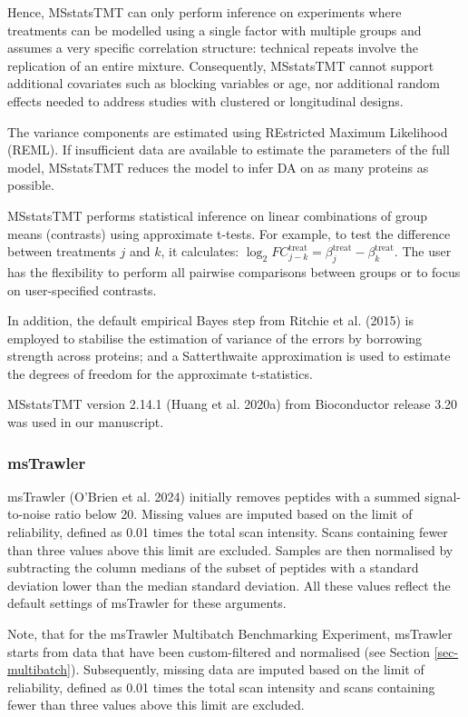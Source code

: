 \documentclass[
  letterpaper,
  DIV=11,
  numbers=noendperiod]{scrartcl}
\begin{document}
Hence, MSstatsTMT can only perform inference on experiments where
treatments can be modelled using a single factor with multiple groups
and assumes a very specific correlation structure: technical repeats
involve the replication of an entire mixture. Consequently, MSstatsTMT
cannot support additional covariates such as blocking variables or age,
nor additional random effects needed to address studies with clustered
or longitudinal designs.

The variance components are estimated using REstricted Maximum
Likelihood (REML). If insufficient data are available to estimate the
parameters of the full model, MSstatsTMT reduces the model to infer DA
on as many proteins as possible.

MSstatsTMT performs statistical inference on linear combinations of
group means (contrasts) using approximate t-tests. For example, to test
the difference between treatments \(j\) and \(k\), it calculates:
\(\log_2 FC_{j-k}^\text{treat}=\beta_j^\text{treat}-\beta_k^\text{treat}\).
The user has the flexibility to perform all pairwise comparisons between
groups or to focus on user-specified contrasts.

In addition, the default empirical Bayes step from Ritchie et al. (2015)
is employed to stabilise the estimation of variance of the errors by
borrowing strength across proteins; and a Satterthwaite approximation is
used to estimate the degrees of freedom for the approximate
t-statistics.

MSstatsTMT version 2.14.1 (Huang et al. 2020a) from Bioconductor release
3.20 was used in our manuscript.

\subsubsection{msTrawler} \label{sec-msTrawler}

msTrawler (O'Brien et al. 2024) initially removes peptides with a summed
signal-to-noise ratio below 20. Missing values are imputed based on the
limit of reliability, defined as 0.01 times the total scan intensity.
Scans containing fewer than three values above this limit are excluded.
Samples are then normalised by subtracting the column medians of the
subset of peptides with a standard deviation lower than the median
standard deviation. All these values reflect the default settings of
msTrawler for these arguments.

Note, that for the msTrawler Multibatch Benchmarking Experiment,
msTrawler starts from data that have been custom-filtered and normalised
(see Section \ref{sec-multibatch}). Subsequently, missing data are
imputed based on the limit of reliability, defined as 0.01 times the
total scan intensity and scans containing fewer than three values above
this limit are excluded.
\end{document}
